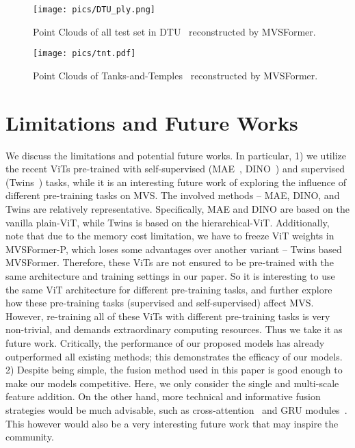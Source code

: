 \documentclass[10pt]{article} \usepackage[preprint]{tmlr}
\begin{document}
\begin{figure}
\begin{centering}
\texttt{[image: pics/DTU\_ply.png]} 
\par\end{centering}
\caption{Point Clouds of all test set in DTU~\citep{aanaes2016large} reconstructed by MVSFormer.}
\label{fig:dtu_ply}
\end{figure}


\begin{figure}
\begin{centering}
\texttt{[image: pics/tnt.pdf]} 
\par\end{centering}
\caption{Point Clouds of Tanks-and-Temples~\citep{Knapitsch2017} reconstructed by MVSFormer.}
\label{fig:tnt_ply}
\end{figure}

\section{Limitations and Future Works}

We discuss the limitations and potential future works. 
In particular, 
1) we utilize the recent ViTs pre-trained with self-supervised (MAE~\citep{he2021masked}, DINO~\citep{caron2021emerging}) and supervised (Twins~\citep{chu2021twins}) tasks, while it is an interesting future work of exploring the influence of different pre-training tasks on MVS. 
The involved methods -- MAE, DINO, and Twins are relatively representative. Specifically, MAE and DINO are based on the vanilla plain-ViT, while Twins is based on the hierarchical-ViT. Additionally, note that due to the memory cost limitation, we have to freeze ViT weights in MVSFormer-P, which loses some advantages over another variant -- Twins based MVSFormer.
Therefore, these ViTs are not ensured to be pre-trained with the same architecture and training settings in our paper.
So it is interesting to use the same ViT architecture for different pre-training tasks, and further explore how these pre-training tasks (supervised and self-supervised) affect MVS. 
However, re-training all of these ViTs with different pre-training tasks is very non-trivial, and demands extraordinary computing resources. Thus we take it as future work. 
Critically, the performance of our proposed models has already outperformed all existing methods; this demonstrates the efficacy of our models.
2) Despite being simple, the fusion method used in this paper is good enough to make our models competitive. 
Here, we only consider the single and multi-scale feature addition. 
On the other hand, more technical and informative fusion strategies would be much advisable, such as cross-attention~\citep{vaswani2017attention} and GRU modules~\citep{cho2014learning}. This however would also be a very interesting future work that may inspire the community.
\end{document}
